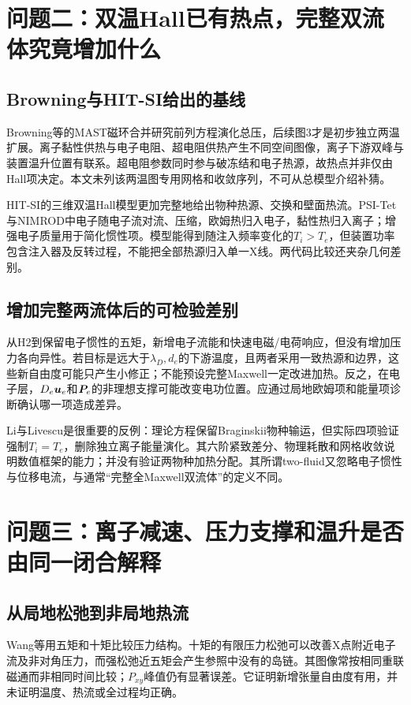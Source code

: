 \section{问题二：双温Hall已有热点，完整双流体究竟增加什么}
\subsection{Browning与HIT-SI给出的基线}
Browning等的MAST磁环合并研究前列方程演化总压，后续图3才是初步独立两温扩展。离子黏性供热与电子电阻、超电阻供热产生不同空间图像，离子下游双峰与装置温升位置有联系。超电阻参数同时参与破冻结和电子热源，故热点并非仅由Hall项决定。本文未列该两温图专用网格和收敛序列，不可从总模型介绍补猜。\citep{L223}

HIT-SI的三维双温Hall模型更加完整地给出物种热源、交换和壁面热流。PSI-Tet与NIMROD中电子随电子流对流、压缩，欧姆热归入电子，黏性热归入离子；增强电子质量用于简化惯性项。模型能得到随注入频率变化的$T_i>T_e$，但装置功率包含注入器及反转过程，不能把全部热源归入单一X线。两代码比较还夹杂几何差别。\citep{Kaptanoglu2020}

\subsection{增加完整两流体后的可检验差别}
从H2到保留电子惯性的五矩，新增电子流能和快速电磁/电荷响应，但没有增加压力各向异性。若目标是远大于$\lambda_D,d_e$的下游温度，且两者采用一致热源和边界，这些新自由度可能只产生小修正；不能预设完整Maxwell一定改进加热。反之，在电子层，$D_e\bm{u}_e$和$\bm{P}_e$的非理想支撑可能改变电功位置。应通过局地欧姆项和能量项诊断确认哪一项造成差异。

Li与Livescu是很重要的反例：理论方程保留Braginskii物种输运，但实际四项验证强制$T_i=T_e$，删除独立离子能量演化。其六阶紧致差分、物理耗散和网格收敛说明数值框架的能力；并没有验证两物种加热分配。其所谓two-fluid又忽略电子惯性与位移电流，与通常“完整全Maxwell双流体”的定义不同。\citep{L247}

\section{问题三：离子减速、压力支撑和温升是否由同一闭合解释}
\subsection{从局地松弛到非局地热流}
Wang等用五矩和十矩比较压力结构。十矩的有限压力松弛可以改善X点附近电子流及非对角压力，而强松弛近五矩会产生参照中没有的岛链。其图像常按相同重联磁通而非相同时间比较；$P_{xy}$峰值仍有显著误差。它证明新增张量自由度有用，并未证明温度、热流或全过程均正确。\citep{Wang2015}

